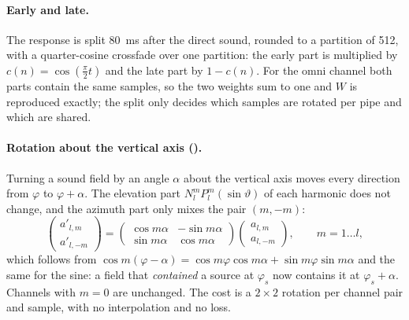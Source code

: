 \paragraph{Early and late.} The response is split \SI{80}{ms} after the direct sound, rounded to a partition of 512,
with a quarter-cosine crossfade over one partition: the early part is multiplied by $c(n) = \cos(\tfrac\pi2 t)$ and
the late part by $1-c(n)$. For the omni channel both parts contain the same samples, so the two weights sum to one
and $W$ is reproduced exactly; the split only decides which samples are rotated per pipe and which are shared.

\paragraph{Rotation about the vertical axis ().} Turning a sound field by an angle $\alpha$ about the
vertical axis moves every direction from $\varphi$ to $\varphi+\alpha$. The elevation part $N_l^mP_l^m(\sin\vartheta)$
of each harmonic does not change, and the azimuth part only mixes the pair $(m,-m)$:
\begin{equation}
  \begin{pmatrix} a'_{l,m} \\ a'_{l,-m}\end{pmatrix} =
  \begin{pmatrix} \cos m\alpha & -\sin m\alpha \\ \sin m\alpha & \cos m\alpha \end{pmatrix}
  \begin{pmatrix} a_{l,m} \\ a_{l,-m}\end{pmatrix},\qquad m = 1\dots l,
\end{equation}
which follows from $\cos m(\varphi-\alpha) = \cos m\varphi\cos m\alpha + \sin m\varphi\sin m\alpha$ and the same for
the sine: a field that \emph{contained} a source at $\varphi_s$ now contains it at $\varphi_s+\alpha$. Channels with
$m=0$ are unchanged. The cost is a $2\times2$ rotation per channel pair and sample, with no interpolation and no loss.

